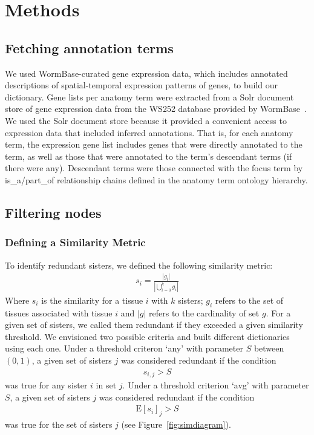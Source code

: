 \documentclass{bmcart}
\begin{document}
\section*{Methods}
\subsection*{Fetching annotation terms}
We used WormBase-curated gene expression data, which includes annotated descriptions of spatial-temporal expression patterns of genes, to build our dictionary. Gene lists per anatomy term were extracted from a Solr document store of gene expression data from the WS252 database provided by WormBase~\cite{Howe2016}. We used the Solr document store because it provided a convenient access to expression data that included inferred annotations. That is, for each anatomy term, the expression gene list includes genes that were directly annotated to the term, as well as those that were annotated to the term's descendant terms (if there were any). Descendant terms were those connected with the focus term by is\_a/part\_of relationship chains defined in the anatomy term ontology hierarchy. 
\subsection*{Filtering nodes}
\subsubsection*{Defining a Similarity Metric}
To identify redundant sisters, we defined the following similarity metric:
\begin{eqnarray}\label{similarity def}
	s_i = \frac{|g_i|}{|\bigcup_{i= 0}^k g_i|}
\end{eqnarray}
Where $s_i$ is the similarity for a tissue $i$ with $k$ sisters; $g_i$ refers to the set of tissues associated with tissue $i$ and $|g|$ refers to the cardinality of set $g$. For a given set of sisters, we called them redundant if they exceeded a given similarity threshold. We envisioned two possible criteria and built different dictionaries using each one. Under a threshold criteron `any' with parameter $S$ between $(0, 1)$, a given set of sisters $j$ was considered redundant if the condition
\begin{eqnarray}\label{any threshold}
	s_{i, j} > S
\end{eqnarray}
was true for any sister $i$ in set $j$. Under a threshold criterion `avg' with parameter $S$, a given set of sisters $j$ was considered redundant if the condition
\begin{eqnarray}\label{avg threshold}
	\mathrm{E}[s_i]_j > S
\end{eqnarray}
was true for the set of sisters $j$ (see Figure~\ref{fig:simdiagram}).
\end{document}
